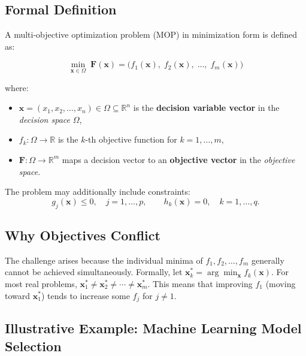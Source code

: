 \documentclass[12pt,a4paper]{article}
\begin{document}
\subsection{Formal Definition}

A multi-objective optimization problem (MOP) in minimization form is defined as:

\begin{equation}
    \min_{\mathbf{x} \in \Omega} \; \mathbf{F}(\mathbf{x})
    = \bigl(f_1(\mathbf{x}),\; f_2(\mathbf{x}),\; \ldots,\; f_m(\mathbf{x})\bigr)
    \label{eq:mop}
\end{equation}

where:
\begin{itemize}[leftmargin=1.5cm]
    \item $\mathbf{x} = (x_1, x_2, \ldots, x_n) \in \Omega \subseteq \mathbb{R}^n$ is the \textbf{decision variable vector} in the \emph{decision space} $\Omega$,
    \item $f_k : \Omega \to \mathbb{R}$ is the $k$-th objective function for $k = 1, \ldots, m$,
    \item $\mathbf{F} : \Omega \to \mathbb{R}^m$ maps a decision vector to an \textbf{objective vector} in the \emph{objective space}.
\end{itemize}

The problem may additionally include constraints:
\begin{equation}
    g_j(\mathbf{x}) \leq 0, \quad j = 1, \ldots, p, \qquad
    h_k(\mathbf{x}) = 0, \quad k = 1, \ldots, q.
\end{equation}

\subsection{Why Objectives Conflict}

The challenge arises because the individual minima of $f_1, f_2, \ldots, f_m$ generally cannot be achieved simultaneously. Formally, let $\mathbf{x}_k^* = \arg\min_{\mathbf{x}} f_k(\mathbf{x})$. For most real problems, $\mathbf{x}_1^* \neq \mathbf{x}_2^* \neq \cdots \neq \mathbf{x}_m^*$. This means that improving $f_1$ (moving toward $\mathbf{x}_1^*$) tends to increase some $f_j$ for $j \neq 1$.

\subsection{Illustrative Example: Machine Learning Model Selection}
\end{document}
